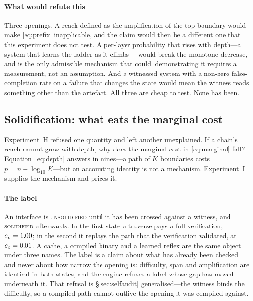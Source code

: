 \documentclass[conference]{IEEEtran}
\theoremstyle{definition}
\begin{document}
\paragraph{What would refute this} Three openings. A reach defined as the
amplification of the top boundary would make \eqref{eq:prefix} inapplicable, and the
claim would then be a different one that this experiment does not test. A per-layer
probability that rises with depth---a system that learns the ladder as it climbs---
would break the monotone decrease, and is the only admissible mechanism that could;
demonstrating it requires a measurement, not an assumption. And a witnessed system
with a non-zero false-completion rate on a failure that changes the state would
mean the witness reads something other than the artefact. All three are cheap to
test. None has been.

\subsection{Solidification: what eats the marginal cost}
\label{sec:solidification}

Experiment~H refused one quantity and left another unexplained. If a chain's reach
cannot grow with depth, why does the marginal cost in \eqref{eq:marginal} fall?
Equation~\eqref{eq:depth} answers in nines---a path of $K$ boundaries costs
$p=n+\log_{10}K$---but an accounting identity is not a mechanism. Experiment~I
supplies the mechanism and prices it.

\paragraph{The label} An interface is \textsc{unsolidified} until it has been crossed
against a witness, and \textsc{solidified} afterwards. In the first state a traverse
pays a full verification, $c_v=1.00$; in the second it replays the path that
the verification validated, at $c_c=0.01$. A cache, a compiled binary and a
learned reflex are the same object under three names. The label is a claim about what
has already been checked and never about how narrow the opening is: difficulty, span
and amplification are identical in both states, and the engine refuses a label whose
gap has moved underneath it. That refusal is \S\ref{sec:selfaudit} generalised---the
witness binds the difficulty, so a compiled path cannot outlive the opening it was
compiled against.
\end{document}
